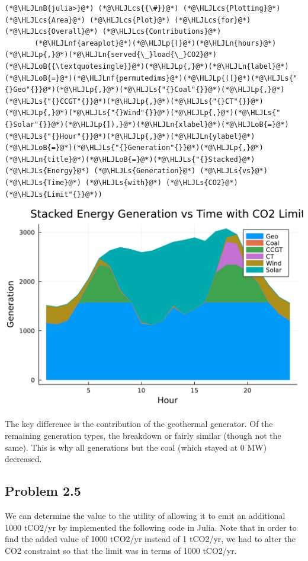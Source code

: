 \documentclass[12pt,a4paper]{article}
\newcommand{\HLJLn}[1]{#1}
\newcommand{\HLJLnf}[1]{\textcolor[RGB]{66,102,213}{#1}}
\newcommand{\HLJLs}[1]{\textcolor[RGB]{201,61,57}{#1}}
\newcommand{\HLJLnB}[1]{\textcolor[RGB]{59,151,46}{#1}}
\newcommand{\HLJLoB}[1]{\textcolor[RGB]{102,102,102}{\textbf{#1}}}
\newcommand{\HLJLp}[1]{#1}
\newcommand{\HLJLcs}[1]{\textcolor[RGB]{153,153,119}{\textit{#1}}}
\begin{document}
\begin{lstlisting}
(*@\HLJLnB{julia>}@*) (*@\HLJLcs{{\#}}@*) (*@\HLJLcs{Plotting}@*) (*@\HLJLcs{Area}@*) (*@\HLJLcs{Plot}@*) (*@\HLJLcs{for}@*) (*@\HLJLcs{Overall}@*) (*@\HLJLcs{Contributions}@*)
       (*@\HLJLnf{areaplot}@*)(*@\HLJLp{(}@*)(*@\HLJLn{hours}@*)(*@\HLJLp{,}@*)(*@\HLJLn{served{\_}load{\_}CO2}@*)(*@\HLJLoB{{\textquotesingle}}@*)(*@\HLJLp{,}@*)(*@\HLJLn{label}@*)(*@\HLJLoB{=}@*)(*@\HLJLnf{permutedims}@*)(*@\HLJLp{([}@*)(*@\HLJLs{"{}Geo"{}}@*)(*@\HLJLp{,}@*)(*@\HLJLs{"{}Coal"{}}@*)(*@\HLJLp{,}@*)(*@\HLJLs{"{}CCGT"{}}@*)(*@\HLJLp{,}@*)(*@\HLJLs{"{}CT"{}}@*)(*@\HLJLp{,}@*)(*@\HLJLs{"{}Wind"{}}@*)(*@\HLJLp{,}@*)(*@\HLJLs{"{}Solar"{}}@*)(*@\HLJLp{]),}@*)(*@\HLJLn{xlabel}@*)(*@\HLJLoB{=}@*)(*@\HLJLs{"{}Hour"{}}@*)(*@\HLJLp{,}@*)(*@\HLJLn{ylabel}@*)(*@\HLJLoB{=}@*)(*@\HLJLs{"{}Generation"{}}@*)(*@\HLJLp{,}@*)(*@\HLJLn{title}@*)(*@\HLJLoB{=}@*)(*@\HLJLs{"{}Stacked}@*) (*@\HLJLs{Energy}@*) (*@\HLJLs{Generation}@*) (*@\HLJLs{vs}@*) (*@\HLJLs{Time}@*) (*@\HLJLs{with}@*) (*@\HLJLs{CO2}@*) (*@\HLJLs{Limit"{}}@*))
\end{lstlisting}
\includegraphics[width=\linewidth]{figures/as2752_hw3_12_2.pdf}

The key difference is the contribution of the geothermal generator. Of the remaining generation types, the breakdown or fairly similar (though not the same).  This is why all generations but the coal (which stayed at 0 MW) decreased.

\subsection{Problem 2.5}
We can determine the value to the utility of allowing it to emit an additional 1000 tCO2/yr by implemented the following code in Julia.  Note that in order to find the added value of 1000 tCO2/yr instead of 1 tCO2/yr, we had to alter the CO2 constraint so that the limit was  in terms of 1000 tCO2/yr.
\end{document}
